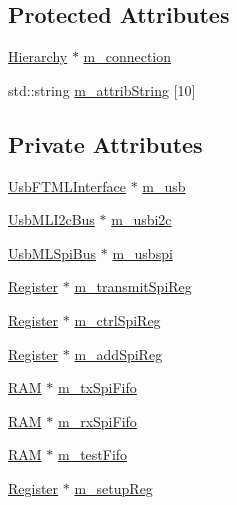 \subsection*{Protected Attributes}
\begin{DoxyCompactItemize}
\item 
\hyperlink{classHierarchy}{Hierarchy} $\ast$ \hyperlink{classElement_abe3de7a5dbbc9a6dd2d7e012e5fdb266}{m\+\_\+connection}
\item 
std\+::string \hyperlink{classAttrib_a3414521d7a82476e874b25a5407b5e63}{m\+\_\+attrib\+String} \mbox{[}10\mbox{]}
\end{DoxyCompactItemize}
\subsection*{Private Attributes}
\begin{DoxyCompactItemize}
\item 
\hyperlink{classUsbFTMLInterface}{Usb\+F\+T\+M\+L\+Interface} $\ast$ \hyperlink{classFePGA_afb7947e600a66d914ee524acec3d8b1f}{m\+\_\+usb}
\item 
\hyperlink{classUsbMLI2cBus}{Usb\+M\+L\+I2c\+Bus} $\ast$ \hyperlink{classFePGA_a09fdde4002008daa0d15672772dd4483}{m\+\_\+usbi2c}
\item 
\hyperlink{classUsbMLSpiBus}{Usb\+M\+L\+Spi\+Bus} $\ast$ \hyperlink{classFePGA_a922a56250b29c9842cdb8095cae8c976}{m\+\_\+usbspi}
\item 
\hyperlink{classRegister}{Register} $\ast$ \hyperlink{classFePGA_a003ee241fb5f32fb3442174db3fe6f49}{m\+\_\+transmit\+Spi\+Reg}
\item 
\hyperlink{classRegister}{Register} $\ast$ \hyperlink{classFePGA_a8fb76733a688dff6d91892a49a97a21f}{m\+\_\+ctrl\+Spi\+Reg}
\item 
\hyperlink{classRegister}{Register} $\ast$ \hyperlink{classFePGA_a569eb8410924bec1c8279ca80dc37a6a}{m\+\_\+add\+Spi\+Reg}
\item 
\hyperlink{classRAM}{R\+AM} $\ast$ \hyperlink{classFePGA_a5b3e4deb73a882e6f044450d8a733558}{m\+\_\+tx\+Spi\+Fifo}
\item 
\hyperlink{classRAM}{R\+AM} $\ast$ \hyperlink{classFePGA_a3ee7f973bfad39b48bbc1a185e9ffaec}{m\+\_\+rx\+Spi\+Fifo}
\item 
\hyperlink{classRAM}{R\+AM} $\ast$ \hyperlink{classFePGA_a97fc9347c90d9a31d99ccb499cc06eee}{m\+\_\+test\+Fifo}
\item 
\hyperlink{classRegister}{Register} $\ast$ \hyperlink{classFePGA_a0255fe229013986b4387c3a75ddf4e97}{m\+\_\+setup\+Reg}

\end{DoxyCompactItemize}
